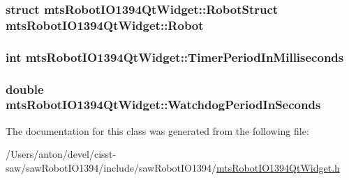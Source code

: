 \subsubsection[{Robot}]{\setlength{\rightskip}{0pt plus 5cm}struct {\bf mts\+Robot\+I\+O1394\+Qt\+Widget\+::\+Robot\+Struct}  mts\+Robot\+I\+O1394\+Qt\+Widget\+::\+Robot\hspace{0.3cm}{\ttfamily [protected]}}\label{classmts_robot_i_o1394_qt_widget_ade381e042472af642876b731415a18af}
\hypertarget{classmts_robot_i_o1394_qt_widget_a4fa3dd1b6769a8a4fc0c51b77dbf3413}{}
\subsubsection[{Timer\+Period\+In\+Milliseconds}]{\setlength{\rightskip}{0pt plus 5cm}int mts\+Robot\+I\+O1394\+Qt\+Widget\+::\+Timer\+Period\+In\+Milliseconds\hspace{0.3cm}{\ttfamily [protected]}}\label{classmts_robot_i_o1394_qt_widget_a4fa3dd1b6769a8a4fc0c51b77dbf3413}
\hypertarget{classmts_robot_i_o1394_qt_widget_a65cefe450636651de5c971d33119c6db}{}
\subsubsection[{Watchdog\+Period\+In\+Seconds}]{\setlength{\rightskip}{0pt plus 5cm}double mts\+Robot\+I\+O1394\+Qt\+Widget\+::\+Watchdog\+Period\+In\+Seconds\hspace{0.3cm}{\ttfamily [protected]}}\label{classmts_robot_i_o1394_qt_widget_a65cefe450636651de5c971d33119c6db}


The documentation for this class was generated from the following file\+:\begin{DoxyCompactItemize}
\item 
/\+Users/anton/devel/cisst-\/saw/saw\+Robot\+I\+O1394/include/saw\+Robot\+I\+O1394/\hyperlink{mts_robot_i_o1394_qt_widget_8h}{mts\+Robot\+I\+O1394\+Qt\+Widget.\+h}\end{DoxyCompactItemize}
